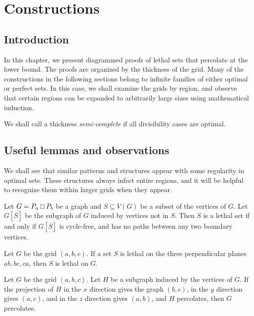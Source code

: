 \chapter{Constructions}

\section{Introduction}

In this chapter, we present diagrammed proofs of lethal sets that percolate at the lower bound. The proofs are organized by the thickness of the grid. Many of the constructions in the following sections belong to infinite families of either optimal or perfect sets. In this case, we shall examine the grids by region, and observe that certain regions can be expanded to arbitrarily large sizes using mathematical induction. 

We shall call a thickness \emph{semi-complete} if all divisibility cases are optimal.

\section{Useful lemmas and observations}

We shall see that similar patterns and structures appear with some regularity in optimal sets. These structures always infect entire regions, and it will be helpful to recognize them within larger grids when they appear. 

\begin{lem}
\label{lem:forest}
Let $G = P_a \Osq P_b$ be a graph and $S \subseteq V(G)$ be a subset of the vertices of $G$. Let $G[\overline{S}]$ be the subgraph of $G$ induced by vertices not in $S$. Then $S$ is a lethal set if and only if $G[\overline{S}]$ is cycle-free, and has no paths between any two boundary vertices. 
\end{lem}

\begin{lem}
\label{lem:three_walls}
Let $G$ be the grid $(a,b,c)$. If a set $S$ is lethal on the three perpendicular planes $ab, bc, ca$, then $S$ is lethal on $G$.
\end{lem}

\begin{lem}
\label{lem:unfold}
Let $G$ be the grid $(a,b,c)$. Let $H$ be a subgraph induced by the vertices of $G$. If the projection of $H$ in the $x$ direction gives the graph $(b,c)$, in the $y$ direction gives $(a,c)$, and in the $z$ direction gives $(a,b)$, and $H$ percolates, then $G$ percolates.
\end{lem}

